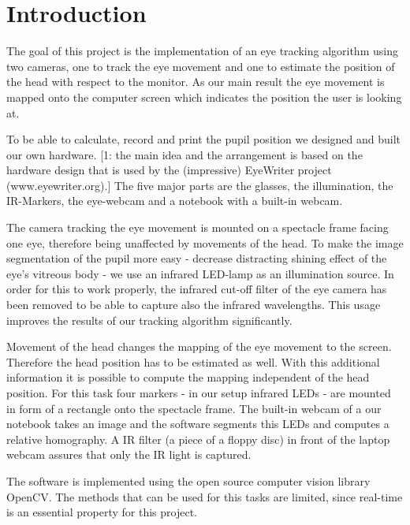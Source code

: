 \section{Introduction}\label{introduction}

The goal of this project is the implementation of an eye tracking algorithm using two cameras, one to track the eye movement and one to estimate the position of the head with respect to the monitor. As our main result the eye movement is mapped onto the computer screen which indicates the position the user is looking at. 

To be able to calculate, record and print the pupil position we designed and built our own hardware. [1: the main idea and the arrangement is based on the hardware design that is used by the (impressive) EyeWriter project (www.eyewriter.org).] 
The five major parts are the glasses, the illumination, the IR-Markers, the eye-webcam and a notebook with a built-in webcam.

The camera tracking the eye movement is mounted on a spectacle frame facing one eye, therefore being unaffected by movements of the head. 
To make the image segmentation of the pupil more easy - decrease distracting shining effect of the eye's vitreous body - we use an infrared LED-lamp as an illumination source. In order for this to work properly, the infrared cut-off filter of the eye camera has been removed to be able to capture also the infrared wavelengths. This usage improves the results of our tracking algorithm significantly.

Movement of the head changes the mapping of the eye movement to the screen. Therefore the head position has to be estimated as well.
With this additional information it is possible to compute the mapping independent of the head position. 
For this task four markers - in our setup infrared LEDs - are mounted in form of a rectangle onto the spectacle frame. The built-in webcam of a our notebook takes an image and the software segments this LEDs and computes a relative homography. A IR filter (a piece of a floppy disc) in front of the laptop webcam assures that only the IR light is captured. 

The software is implemented using the open source computer vision library OpenCV. The methods that can be used for this tasks are limited, since real-time is an essential property for this project.

